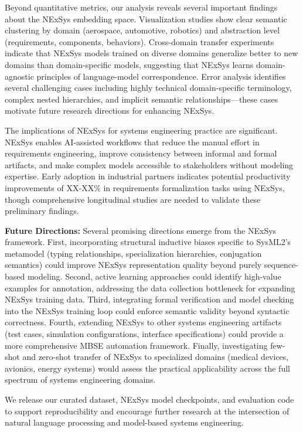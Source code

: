 \documentclass{article}
\begin{document}
Beyond quantitative metrics, our analysis reveals several important findings about the NExSys embedding space. Visualization studies show clear semantic clustering by domain (aerospace, automotive, robotics) and abstraction level (requirements, components, behaviors). Cross-domain transfer experiments indicate that NExSys models trained on diverse domains generalize better to new domains than domain-specific models, suggesting that NExSys learns domain-agnostic principles of language-model correspondence. Error analysis identifies several challenging cases including highly technical domain-specific terminology, complex nested hierarchies, and implicit semantic relationships—these cases motivate future research directions for enhancing NExSys.

The implications of NExSys for systems engineering practice are significant. NExSys enables AI-assisted workflows that reduce the manual effort in requirements engineering, improve consistency between informal and formal artifacts, and make complex models accessible to stakeholders without modeling expertise. Early adoption in industrial partners indicates potential productivity improvements of XX-XX\% in requirements formalization tasks using NExSys, though comprehensive longitudinal studies are needed to validate these preliminary findings.

\textbf{Future Directions:} Several promising directions emerge from the NExSys framework. First, incorporating structural inductive biases specific to SysML2's metamodel (typing relationships, specialization hierarchies, conjugation semantics) could improve NExSys representation quality beyond purely sequence-based modeling. Second, active learning approaches could identify high-value examples for annotation, addressing the data collection bottleneck for expanding NExSys training data. Third, integrating formal verification and model checking into the NExSys training loop could enforce semantic validity beyond syntactic correctness. Fourth, extending NExSys to other systems engineering artifacts (test cases, simulation configurations, interface specifications) could provide a more comprehensive MBSE automation framework. Finally, investigating few-shot and zero-shot transfer of NExSys to specialized domains (medical devices, avionics, energy systems) would assess the practical applicability across the full spectrum of systems engineering domains.

We release our curated dataset, NExSys model checkpoints, and evaluation code to support reproducibility and encourage further research at the intersection of natural language processing and model-based systems engineering.
\end{document}
